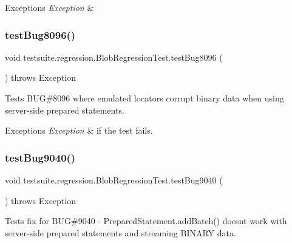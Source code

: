 \begin{DoxyExceptions}{Exceptions}
{\em Exception} & \\
\hline
\end{DoxyExceptions}
\mbox{\label{classtestsuite_1_1regression_1_1_blob_regression_test_aff4364ccb7977bcf4f76faf8ebd1a8b2}} 
\subsubsection{\texorpdfstring{test\+Bug8096()}{testBug8096()}}
{\footnotesize\ttfamily void testsuite.\+regression.\+Blob\+Regression\+Test.\+test\+Bug8096 (\begin{DoxyParamCaption}{ }\end{DoxyParamCaption}) throws Exception}

Tests B\+UG\#8096 where emulated locators corrupt binary data when using server-\/side prepared statements.


\begin{DoxyExceptions}{Exceptions}
{\em Exception} & if the test fails. \\
\hline
\end{DoxyExceptions}
\mbox{\label{classtestsuite_1_1regression_1_1_blob_regression_test_ac14a4cb77c1dd15dae977435a20e0880}} 
\subsubsection{\texorpdfstring{test\+Bug9040()}{testBug9040()}}
{\footnotesize\ttfamily void testsuite.\+regression.\+Blob\+Regression\+Test.\+test\+Bug9040 (\begin{DoxyParamCaption}{ }\end{DoxyParamCaption}) throws Exception}

Tests fix for B\+UG\#9040 -\/ Prepared\+Statement.\+add\+Batch() doesn\textquotesingle{}t work with server-\/side prepared statements and streaming B\+I\+N\+A\+RY data.


